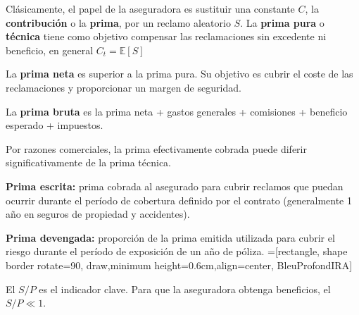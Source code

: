 \begin{f}
Clásicamente, el papel de la aseguradora es sustituir una constante \(C\), la \textbf{contribución} o la \textbf{prima}, por un reclamo aleatorio \(S\).
La \textbf{prima pura} o \textbf{técnica} tiene como objetivo 
compensar las reclamaciones sin excedente ni beneficio, en general \(C_t = \mathbb{E}[S]\)
	
	La \textbf{prima neta} es superior a la prima pura. Su objetivo es cubrir el coste de las reclamaciones y proporcionar un margen de seguridad.
	
	La \textbf{prima bruta} es la prima neta + gastos generales + comisiones + beneficio esperado + impuestos.
	
	Por razones comerciales, la prima efectivamente cobrada puede diferir significativamente de la prima técnica.

	\textbf{Prima escrita:} prima cobrada al asegurado para cubrir reclamos que puedan ocurrir durante el período de 
cobertura definido por el contrato (generalmente 1 año en seguros de propiedad y accidentes).

\textbf{Prima devengada:} proporción de la prima emitida utilizada para cubrir el riesgo durante el período de exposición de un 
año de póliza.
=[rectangle, shape border rotate=90, draw,minimum height=0.6cm,align=center, BleuProfondIRA]

\resizebox{\linewidth}{!}
{
}
El \(S/P\) es el indicador clave. Para que la aseguradora obtenga beneficios, el \(S/P\ll 1\).
\end{f}

